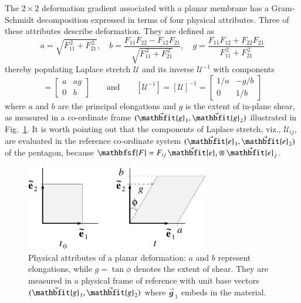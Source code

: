 The $2 \times 2$ deformation gradient associated with a planar membrane has a Gram-Schmidt decomposition expressed in terms of four physical attributes.  Three of these attributes describe deformation.  They are defined as \cite{Freedetal17}
\begin{equation}
a = \sqrt{F_{11}^{\,2} + F_{21}^{\,2}} , \quad
b = \frac{F_{11} F_{22} - F_{12} F_{21}}
{\sqrt{F_{11}^{\,2} + F_{21}^{\,2}}} , \quad
g = \frac{F_{11} F_{12} +  F_{22} F_{21}}
{F_{11}^{\,2} + F_{21}^{\,2}} 
\label{physicalVariables}
\end{equation}
thereby populating Laplace stretch $\boldsymbol{\mathcal{U}}$ and its inverse $\boldsymbol{\mathcal{U}}^{-1}$ with components
\begin{equation}
[ \boldsymbol{\mathcal{U}} ] = \begin{bmatrix}
a & a g \\ 0 & b
\end{bmatrix} \qquad \text{and} \qquad
[ \boldsymbol{\mathcal{U}}^{-1} ] = 
[ \boldsymbol{\mathcal{U}} ]^{-1} = \begin{bmatrix} 
1 / a & -g / b \\ 0 & 1 / b
\end{bmatrix}
\label{LaplaceStretch}
\end{equation}
where $a$ and $b$ are the principal elongations and $g$ is the extent of in-plane shear, as measured in a co-ordinate frame $(  \vec{\mathbfit{g}}_{\hspace{0.5pt}1} , \vec{\mathbfit{g}}_{\hspace{0.5pt}2} )$ illustrated in Fig.~\ref{figKinematics}.  It is worth pointing out that the components of Laplace stretch, viz., $\mathcal{U}_{ij}$, are evaluated in the reference co-ordinate system $( \vec{\mathbfit{e}}_{\hspace{0.5pt}1} , \vec{\mathbfit{e}}_{\hspace{0.5pt}2} )$ of the pentagon, because $\mathbfsf{F} = F_{ij} \, \vec{\mathbfit{e}}_{\hspace{0.5pt}i} \otimes \vec{\mathbfit{e}}_{\hspace{0.5pt}j}$.

\begin{figure}
	\centering
	\includegraphics[width=8cm]{figures/deformation.pdf}
	\caption{Physical attributes of a planar deformation: $a$ and $b$ represent elongations, while $g = \tan \phi$ denotes the extent of shear.  They are measured in a physical frame of reference with unit base vectors $( \vec{\mathbfit{g}}_{\hspace{0.5pt}1} , \vec{\mathbfit{g}}_{\hspace{0.5pt}2} )$ where $\vec{\mathbfit{g}}_{\,1}$ embeds in the material.}
	\label{figKinematics}
\end{figure}

